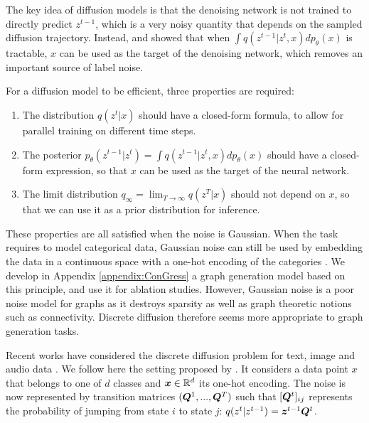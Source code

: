 \documentclass{article} %
\theoremstyle{plain}
\theoremstyle{definition}
\theoremstyle{remark}
\begin{document}
The key idea of diffusion models is that the denoising network is not trained to directly predict $z^{t-1}$, which is a very noisy quantity that depends on the sampled diffusion trajectory. Instead, \citet{sohldickstein2015diffusion} and \citet{song2019estimatinggradients} showed that when $\int q(z^{t-1} | z^t, x) dp_\theta(x)$ is tractable, $x$ can be used as the target of the denoising network, which removes an important source of label noise.

For a diffusion model to be efficient, three properties are required: 
\begin{enumerate}
    \item The distribution $q(z^t | x)$ should have a closed-form formula, to allow for parallel training on different time steps.
    \item The posterior $p_\theta(z^{t-1} | z^t) = \int q(z^{t-1} | z^t, x) dp_\theta(x)$ should have a closed-form expression, so that $x$ can be used as the target of the neural network.
    \item The limit distribution $q_\infty = \lim_{T \to \infty} q(z^T | x)$ should not depend on $x$, so that we can use it as a prior distribution for inference.
\end{enumerate}

These properties are all satisfied when the noise is Gaussian. When the task requires to model categorical data, Gaussian noise can still be used by embedding the data in a continuous space with a one-hot encoding of the categories \citep{niu2020permutation,jo2022score}. We develop in Appendix \ref{appendix:ConGress} a graph generation model based on this principle, and use it for ablation studies. However, Gaussian noise is a poor noise model for graphs as it destroys sparsity as well as graph theoretic notions such as connectivity. Discrete diffusion therefore seems more appropriate to graph generation tasks.

Recent works have considered the discrete diffusion problem for text, image and audio data \citep{hoogeboom2021argmax, johnson2021beyond, yang2022diffsound}. We follow here the setting proposed by \citet{austin2021structured}.
It considers a data point $x$ that belongs to one of $d$ classes and ${\bm{x}} \in \mathbb{R}^d$ its one-hot encoding.
The noise is now represented by transition matrices $({\bm{Q}}^1, ..., {\bm{Q}}^{T})$ such that $[{\bm{Q}}^{t}]_{ij}$ represents the probability of jumping from state $i$ to state $j$: $q(z^{t} |z^{t-1}) = {\bm{z}}^{t-1} {\bm{Q}}^{t}$.
\end{document}
